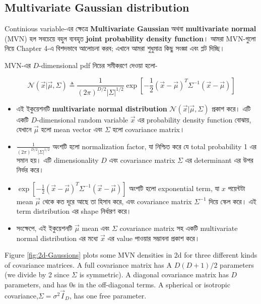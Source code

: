 \documentclass[graybox, envcountchap, twocolumn]{styles/svmult}
\begin{document}
\subsection{Multivariate Gaussian distribution}
\label{sec:MVN}
{\bengalifont 
Continious variable-এর ক্ষেত্রে 
\textbf{Multivariate Gaussian} অথবা \textbf{multivariate normal} (MVN) হল সবচেয়ে বহুল ব্যবহৃত \textbf{joint probability density function}।  আমরা MVN-গুলো নিয়ে Chapter 4-এ বিশদভাবে আলোচনা করব; এখানে আমরা শুধুমাত্র কিছু সংজ্ঞা এবং প্লট দিচ্ছি।

{\bengalifont MVN-এর $D$-dimensional pdf নিচের সমীকরণে দেওয়া হলো-}


\begin{equation}
\mathcal{N}(\vec{x}|\vec{\mu},\Sigma) \triangleq \dfrac{1}{(2\pi)^{D/2}|\Sigma|^{1/2}}\exp\left[-\dfrac{1}{2}(\vec{x}-\vec{\mu})^T\Sigma^{-1}(\vec{x}-\vec{\mu})\right]
\end{equation}

\begin{itemize}
    \item {\bengalifont এই ইকুয়েশনটি {\bf multivariate normal distribution} $\mathcal{N}(\vec{x}|\vec{\mu}, \Sigma)$ প্রকাশ করে। এটি একটি $D$-dimensional random variable $\vec{x}$ এর probability density function বোঝায়, যেখানে $\vec{\mu}$ হলো mean vector এবং $\Sigma$ হলো covariance matrix।}
    \item {\bengalifont $\frac{1}{(2\pi)^{D/2}|\Sigma|^{1/2}}$ অংশটি হলো normalization factor, যা নিশ্চিত করে যে total probability 1 এর সমান হয়। এটি dimensionality $D$ এবং covariance matrix $\Sigma$ এর determinant এর উপর নির্ভর করে।}
    \item {\bengalifont $\exp\left[-\frac{1}{2}(\vec{x} - \vec{\mu})^T\Sigma^{-1}(\vec{x} - \vec{\mu})\right]$ অংশটি হলো exponential term, যা $x$ পয়েন্টটা mean $\vec{\mu}$ থেকে কত দূরে আছে তা হিসাব করে, এবং covariance matrix $\Sigma^{-1}$ দিয়ে স্কেল করে। এই term distribution এর shape নির্ধারণ করে।}
    \item {\bengalifont সংক্ষেপে, এই ইকুয়েশনটি $\vec{\mu}$ mean এবং $\Sigma$ covariance matrix সহ একটি multivariate normal distribution এর মধ্যে $\vec{x}$ এর value পাওয়ার সম্ভাবনা প্রকাশ করে।}
\end{itemize}

Figure \ref{fig:2d-Gaussions} plots some MVN densities in 2d for three different kinds of covariance matrices. A full covariance matrix has A $D(D+1)/2$ parameters (we divide by 2 since $\Sigma$ is symmetric). A diagonal covariance matrix has $D$ parameters, and has 0s in the off-diagonal terms. A spherical or isotropic covariance,$\Sigma=\sigma^2\vec{I}_D$, has one free parameter.

}
\end{document}

